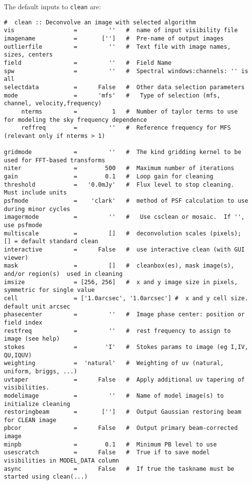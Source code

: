 The default inputs to {\tt clean} are:
\small
\begin{verbatim}
#  clean :: Deconvolve an image with selected algorithm
vis                 =         ''   #  name of input visibility file
imagename           =       ['']   #  Pre-name of output images
outlierfile         =         ''   #  Text file with image names, sizes, centers
field               =         ''   #  Field Name
spw                 =         ''   #  Spectral windows:channels: '' is all
selectdata          =      False   #  Other data selection parameters
mode                =      'mfs'   #   Type of selection (mfs, channel, velocity,frequency)
     nterms         =          1   #  Number of taylor terms to use for modeling the sky frequency dependence
     reffreq        =         ''   #  Reference frequency for MFS (relevant only if nterms > 1)

gridmode            =         ''   #  The kind gridding kernel to be used for FFT-based transforms
niter               =        500   #  Maximum number of iterations
gain                =        0.1   #  Loop gain for cleaning
threshold           =   '0.0mJy'   #  Flux level to stop cleaning.  Must include units
psfmode             =    'clark'   #  method of PSF calculation to use during minor cycles
imagermode          =         ''   #   Use csclean or mosaic.  If '', use psfmode
multiscale          =         []   #  deconvolution scales (pixels); [] = default standard clean
interactive         =      False   #  use interactive clean (with GUI viewer)
mask                =         []   #  cleanbox(es), mask image(s), and/or region(s)  used in cleaning
imsize              = [256, 256]   #  x and y image size in pixels, symmetric for single value
cell                = ['1.0arcsec', '1.0arcsec'] #  x and y cell size. default unit arcsec
phasecenter         =         ''   #  Image phase center: position or field index
restfreq            =         ''   #  rest frequency to assign to image (see help)
stokes              =        'I'   #  Stokes params to image (eg I,IV, QU,IQUV)
weighting           =  'natural'   #  Weighting of uv (natural, uniform, briggs, ...)
uvtaper             =      False   #  Apply additional uv tapering of  visibilities.
modelimage          =         ''   #  Name of model image(s) to initialize cleaning
restoringbeam       =       ['']   #  Output Gaussian restoring beam for CLEAN image
pbcor               =      False   #  Output primary beam-corrected image
minpb               =        0.1   #  Minimum PB level to use
usescratch          =      False   #  True if to save model visibilities in MODEL_DATA column
async               =      False   #  If true the taskname must be started using clean(...)
\end{verbatim}
\normalsize

